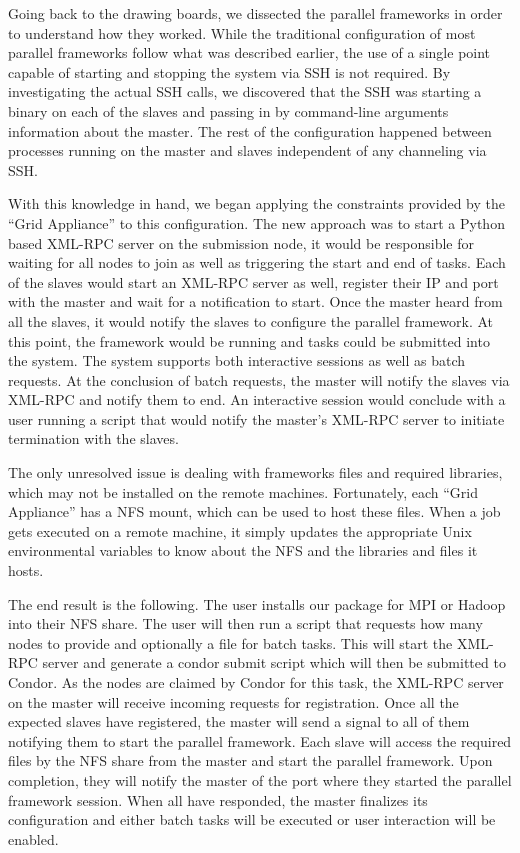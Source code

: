 \documentclass[twocolumn]{svjour3}
\begin{document}
Going back to the drawing boards, we dissected the parallel frameworks in order
to understand how they worked.  While the traditional configuration of most
parallel frameworks follow what was described earlier, the use of a single
point capable of starting and stopping the system via SSH is not required.  By
investigating the actual SSH calls, we discovered that the SSH was starting a
binary on each of the slaves and passing in by command-line arguments
information about the master.  The rest of the configuration happened between
processes running on the master and slaves independent of any channeling via
SSH.

With this knowledge in hand, we began applying the constraints provided by the
``Grid Appliance'' to this configuration.  The new approach was to start a
Python based XML-RPC server on the submission node, it would be responsible for
waiting for all nodes to join as well as triggering the start and end of tasks.
Each of the slaves would start an XML-RPC server as well, register their IP and
port with the master and wait for a notification to start.  Once the master
heard from all the slaves, it would notify the slaves to configure the parallel
framework.  At this point, the framework would be running and tasks could be
submitted into the system.  The system supports both interactive sessions as
well as batch requests.  At the conclusion of batch requests, the master will
notify the slaves via XML-RPC and notify them to end.  An interactive session
would conclude with a user running a script that would notify the master's
XML-RPC server to initiate termination with the slaves.

The only unresolved issue is dealing with frameworks files and required
libraries, which may not be installed on the remote machines.  Fortunately,
each ``Grid Appliance'' has a NFS mount, which can be used to host these files.
When a job gets executed on a remote machine, it simply updates the appropriate
Unix environmental variables to know about the NFS and the libraries and files
it hosts.

The end result is the following.  The user installs our package for MPI or
Hadoop into their NFS share.  The user will then run a script that requests how
many nodes to provide and optionally a file for batch tasks.  This will start
the XML-RPC server and generate a condor submit script which will then be
submitted to Condor.  As the nodes are claimed by Condor for this task, the
XML-RPC server on the master will receive incoming requests for registration.
Once all the expected slaves have registered, the master will send a signal to
all of them notifying them to start the parallel framework.  Each slave will
access the required files by the NFS share from the master and start the
parallel framework.  Upon completion, they will notify the master of the port
where they started the parallel framework session.  When all have responded,
the master finalizes its configuration and either batch tasks will be executed
or user interaction will be enabled.
\end{document}
